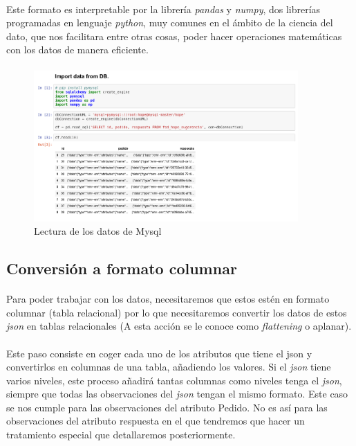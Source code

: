 \documentclass[10pt,a4paper,oneside]{book}
\begin{document}
\paragraph{}
Este formato es interpretable por la librería \textit{pandas} y \textit{numpy}, dos librerías programadas en lenguaje \textit{python}, muy comunes en el ámbito de la ciencia del dato, que nos facilitara entre otras cosas, poder hacer operaciones matemáticas con los datos de manera eficiente.

\paragraph{}
\begin{figure}[!htb]
  \centering
  \includegraphics[width=0.9\textwidth]{images/metodologia-extract-data-mysql.png}
  \caption{Lectura de los datos de Mysql}
\end{figure}

\newpage
\subsection{Conversión a formato columnar}

\paragraph{}
Para poder trabajar con los datos, necesitaremos que estos estén en formato columnar (tabla relacional) por lo que necesitaremos convertir los datos de estos \textit{json} en tablas relacionales (A esta acción se le conoce como \textit{flattening} o aplanar). 

\paragraph{}
Este paso consiste en coger cada uno de los atributos que tiene el json y convertirlos en columnas de una tabla, añadiendo los valores. Si el \textit{json} tiene varios niveles, este proceso añadirá tantas columnas como niveles tenga el \textit{json}, siempre que todas las observaciones del \textit{json} tengan el mismo formato. Este caso se nos cumple para las observaciones del atributo Pedido. No es así para las observaciones del atributo respuesta en el que tendremos que hacer un tratamiento especial que detallaremos posteriormente.
\end{document}
